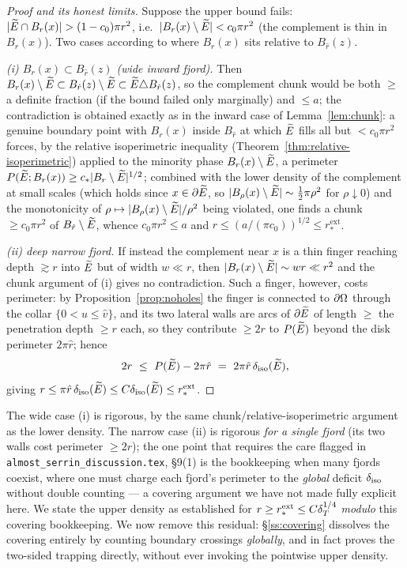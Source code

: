 \begin{proof}[Proof and its honest limits]
Suppose the upper bound fails: $|\Etil\cap B_r(x)|>(1-c_0)\pi r^2$, i.e.\
$|B_r(x)\setminus\widetilde E|<c_0\pi r^2$ (the complement is thin in $B_r(x)$).
Two cases according to where $B_r(x)$ sits relative to $B_{\hat r}(z)$.

\emph{(i) $B_r(x)\subset B_{\hat r}(z)$ (wide inward fjord).} Then
$B_r(x)\setminus\widetilde E\subset B_{\hat r}(z)\setminus\widetilde E\subset
\widetilde E\triangle B_{\hat r}(z)$, so the complement chunk would be both
$\ge$ a definite fraction (if the bound failed only marginally) and $\le a$;
the contradiction is obtained exactly as in the inward case of
Lemma~\ref{lem:chunk}: a genuine boundary point with $B_r(x)$ inside
$B_{\hat r}$ at which $\widetilde E$ fills all but $<c_0\pi r^2$ forces, by the
relative isoperimetric inequality
(Theorem~\ref{thm:relative-isoperimetric}) applied to the minority phase
$B_r(x)\setminus\widetilde E$, a perimeter $P(\widetilde E;B_r(x))\ge c_*|B_r\setminus
\widetilde E|^{1/2}$; combined with the lower density of the complement at small
scales (which holds since $x\in\partial\widetilde E$, so $|B_\rho(x)\setminus\widetilde E|
\sim\tfrac12\pi\rho^2$ for $\rho\downarrow0$) and the monotonicity of
$\rho\mapsto|B_\rho(x)\setminus\widetilde E|/\rho^2$ being violated, one finds a
chunk $\ge c_0\pi r^2$ of $B_{\hat r}\setminus\widetilde E$, whence
$c_0\pi r^2\le a$ and $r\le(a/(\pi c_0))^{1/2}\le r_*^{\mathrm{ext}}$.

\emph{(ii) deep narrow fjord.} If instead the complement near $x$ is a thin
finger reaching depth $\gtrsim r$ into $\widetilde E$ but of width $w\ll r$, then
$|B_r(x)\setminus\widetilde E|\sim w r\ll r^2$ and the chunk argument of (i) gives
no contradiction. Such a finger, however, costs perimeter: by
Proposition~\ref{prop:noholes} the finger is connected to $\partial\Omega$
through the collar $\{0<u\le\hat v\}$, and its two lateral walls are arcs of
$\partial\widetilde E$ of length $\ge$ the penetration depth $\ge r$ each, so they
contribute $\ge 2r$ to $P(\widetilde E)$ beyond the disk perimeter $2\pi\hat r$;
hence
\[
   2r\ \le\ P(\Etil)-2\pi\hat r\ =\ 2\pi\hat r\,\diso(\Etil),
\]
giving $r\le\pi\hat r\,\delta_{\mathrm{iso}}(\widetilde E)\le C\delta_{\mathrm{iso}}(\widetilde E)\le r_*^{\mathrm{ext}}$.
\end{proof}

\begin{remark}\label{rem:upper-status}
The wide case (i) is rigorous, by the same chunk/relative-isoperimetric
argument as the lower density. The narrow case (ii) is rigorous \emph{for a
single fjord} (its two walls cost perimeter $\ge2r$); the one point that
requires the care flagged in \texttt{almost\_serrin\_discussion.tex}, \S9(1)
is the bookkeeping when many fjords coexist, where one must charge each
fjord's perimeter to the \emph{global} deficit $\delta_{\mathrm{iso}}$ without double
counting --- a covering argument we have not made fully explicit here. We
state the upper density as established for $r\ge r_*^{\mathrm{ext}}\le
C\delta_T^{1/4}$ \emph{modulo} this covering bookkeeping. We now remove this
residual: \S\ref{ss:covering} dissolves the covering entirely by counting
boundary crossings \emph{globally}, and in fact proves the two-sided
trapping directly, without ever invoking the pointwise upper density.
\end{remark}


